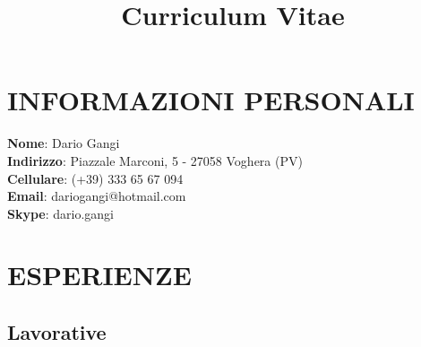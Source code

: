 \documentclass[11pt,a4paper,sans]{moderncv} %
\title{Curriculum Vitae}
\begin{document}

\makecvtitle %

\section{INFORMAZIONI PERSONALI}
\textbf{Nome}: \hspace{8mm} Dario Gangi
\\
\textbf{Indirizzo}: \hspace{4mm} Piazzale Marconi, 5 - 27058 Voghera (PV)
\\
\textbf{Cellulare}: \hspace{4.5mm} (+39) 333 65 67 094
\\
\textbf{Email}: \hspace{9mm} dariogangi@hotmail.com
\\
\textbf{Skype}: \hspace{8.5mm} dario.gangi


\section{ESPERIENZE}

\subsection{Lavorative}
\end{document}
